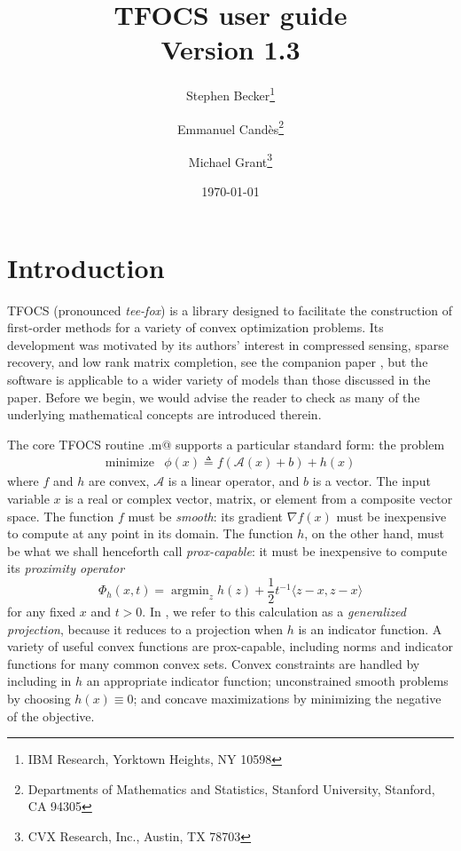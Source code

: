 \documentclass{article}
\title{TFOCS user guide\\\large Version 1.3} %
\author{Stephen Becker\thanks{IBM Research, Yorktown Heights, NY 10598} \and
Emmanuel Cand\`es\thanks{Departments of Mathematics and Statistics, Stanford University, Stanford, CA 94305} \and
Michael Grant\thanks{CVX Research, Inc., Austin, TX 78703}}
\date{\today}
\newcommand{\cA}{\ensuremath{\mathcal{A}}}    %
\DeclareMathOperator*{\minimize}{minimize}
\DeclareMathOperator*{\argmin}{argmin}
\newcommand\thalf{{\textstyle\frac{1}{2}}}
\newcommand{\<}{\langle}
\renewcommand{\>}{\rangle}
\begin{document}
\maketitle

\tableofcontents

\section{Introduction}

TFOCS (pronounced \emph{tee-fox}) is a library designed to facilitate
the construction of first-order methods for a variety of convex
optimization problems. Its development was motivated by its authors'
interest in compressed sensing, sparse recovery, and low rank matrix
completion, see the companion paper \cite{TFOCS}, but the software is
applicable to a wider variety of models than those discussed in the
paper. Before we begin, we would advise the reader to check
\cite{TFOCS} as many of the underlying mathematical concepts are
introduced therein.

The core TFOCS routine \verb@tfocs.m@ supports a particular standard
form: the problem
\begin{equation} 
	\label{eq:stdform}
	\begin{array}{ll}
	\minimize & \phi(x) \triangleq f(\cA(x)+b) + h(x)
	\end{array}
\end{equation}
where $f$ and $h$ are convex, $\cA$ is a linear operator,
and $b$ is a vector. 
The input variable $x$ is a real or complex vector, matrix, or element
from a composite vector space.
The function $f$ must be \emph{smooth}:
its gradient $\nabla f(x)$ must be inexpensive to compute at any
point in its domain. The function $h$,
on the other hand, must be what we shall
henceforth call \emph{prox-capable}: it must
be inexpensive to compute its \emph{proximity operator}
\begin{equation}
	\label{eq:proxmin}
	\Phi_h(x,t) = \argmin_z h(z) + \thalf t^{-1} \<z-x,z-x\>
\end{equation}
for any fixed $x$ and $t>0$. 
In \cite{TFOCS}, we refer to this calculation as a \emph{generalized
projection}, because it reduces to a projection when $h$ is an indicator
function. A variety of useful convex functions are
prox-capable, including norms and indicator functions for many
common convex sets.
Convex constraints are handled by including in $h$ an appropriate
indicator function; unconstrained smooth problems
by choosing $h(x)\equiv 0$; and concave maximizations by
minimizing the negative of the objective.
\end{document}
